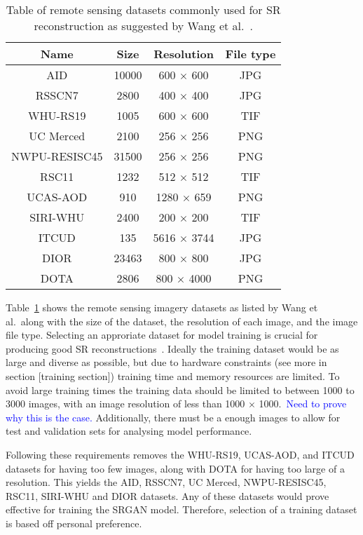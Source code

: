 \begin{table}
    \centering
    \begin{tabular}{|cccc|}
        \hline
        \textbf{Name} & \textbf{Size} & \textbf{Resolution} & \textbf{File type} \\
        \hline
        AID & 10000 & 600 $\times$ 600 & JPG \\
        RSSCN7 & 2800 & 400 $\times$ 400 & JPG \\
        WHU-RS19 & 1005 & 600 $\times$ 600 & TIF \\
        UC Merced & 2100 & 256 $\times$ 256 & PNG \\
        NWPU-RESISC45 & 31500 & 256 $\times$ 256 & PNG \\
        RSC11 & 1232 & 512 $\times$ 512 & TIF \\
        UCAS-AOD & 910 & 1280 $\times$ 659 & PNG \\
        SIRI-WHU & 2400 & 200 $\times$ 200 & TIF \\
        ITCUD & 135 & 5616 $\times$ 3744 & JPG \\
        DIOR & 23463 & 800 $\times$ 800 & JPG \\
        DOTA & 2806 & 800 $\times$ 4000 & PNG \\
        \hline
    \end{tabular}
    \caption{Table of remote sensing datasets commonly used for SR reconstruction as suggested by Wang et al.~\cite{remoteSensingDeepLearningReview,remoteSensingGANsReview}.}
    \label{table:datasets_table}
\end{table}

Table~\ref{table:datasets_table} shows the remote sensing imagery datasets as listed by Wang et al.\ along with the size of the dataset, the resolution of each image, and the image file type. Selecting an approriate dataset for model training is crucial for producing good SR reconstructions~\cite{ref}. Ideally the training dataset would be as large and diverse as possible, but due to hardware constraints (see more in section [training section]) training time and memory resources are limited. To avoid large training times the training data should be limited to between 1000 to 3000 images, with an image resolution of less than 1000 $\times$ 1000.\ \textcolor{blue}{Need to prove why this is the case.} Additionally, there must be a enough images to allow for test and validation sets for analysing model performance.

Following these requirements removes the WHU-RS19, UCAS-AOD, and ITCUD datasets for having too few images, along with DOTA for having too large of a resolution. This yields the AID, RSSCN7, UC Merced, NWPU-RESISC45, RSC11, SIRI-WHU and DIOR datasets. Any of these datasets would prove effective for training the SRGAN model. Therefore, selection of a training dataset is based off personal preference. 

